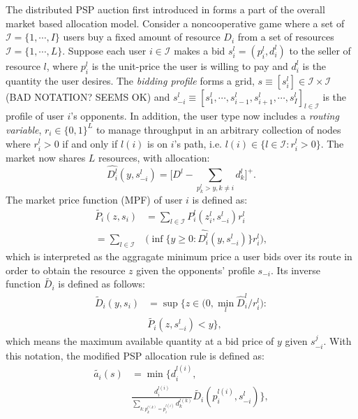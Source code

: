 \documentclass[12pt]{article}
\theoremstyle{definition}
\newcommand{\mcI}{\mathcal{I}}
\begin{document}
\begin{multicols}{2}
The distributed PSP auction first introduced in \cite{lazar} forms a part of the
overall market based allocation model. Consider a noncooperative game
where a set of $\mcI = \lbrace 1,\cdots,I\rbrace$ users buy a fixed
amount of resource $D_i$ from a set of resources $\mcI = \lbrace 1,\cdots,L\rbrace$. Suppose
each user $i \in \mcI$ makes a bid $s_i^l = (p_i^l, d_i^l)$ to the
seller of resource $l$,
where $p_i^l$ is the unit-price the user is willing to pay and $d_i^l$ is the
quantity the user desires. The \emph{bidding profile} forms a grid, $s \equiv
[s_i^l] \in \mcI \times \mcI$ (BAD NOTATION?
SEEMS OK)  and $s_{−i}^l \equiv [s_1^l , \cdots , s_{i−1}^l , s_{i+1}^l , \cdots
, s_I^l]_{l\in\mcI}$ is
the profile of user $i$’s opponents. In addition, the user type now includes a
\emph{routing variable}, $r_i\in\lbrace 0, 1\rbrace^L$ to manage throughput in
an arbitrary collection of nodes where $r_i^l >0$ if and only if $l(i)$ is on
$i$'s path, i.e. $l(i) \in \lbrace l\in \mcI : r_i^l >0\rbrace$. 
The market now shares $L$ resources, with allocation:
$$
    \hat{D_i^l}(y,s_{-i}^l) = \bigg\lbrack D^l -
\displaystyle\sum_{p_k^l > y, k\ne i} d_k^l\bigg\rbrack^+.
$$
The market price function (MPF) of user $i$ is defined as:
\begin{align*}
    \tilde{P_i}(z, s_i) &= \displaystyle\sum_{l\in\mcI}P_i^l(z_i^l,
s_{-i}^l)r_i^l \\
    = \displaystyle\sum_{l\in\mcI}&\bigg(\inf\bigg\lbrace y\ge 0 :
\hat{D_i^l}(y,s_{-i}^l)\bigg\rbrace r_i^l\bigg),
\end{align*}
which is interpreted as the aggragate minimum price a user bids over its route in order to obtain the
resource $z$ given the opponents’ profile $s_{−i}$. Its inverse function
$\tilde{D_i}$ is defined as follows:
\begin{align*}
    \tilde{D}_i(y, s_i) &= \sup\bigg\lbrace z\in \bigg( 0,
\min_l\hat{D}_i^l/r_i^l\bigg) : \\
    &\tilde{P_i}(z,s_{-i}^l) < y\bigg\rbrace,
\end{align*}
which means the maximum available quantity at a bid price of $y$ given
$s_{−i}^j$. With this notation, the modified PSP allocation rule \cite{tuffin} is defined
as:
\begin{align*}
    \tilde{a_i}(s) &= \min\big\lbrace d_i^{l(i)}, \\
 &\frac{d_i^{l(i)}}{\sum_{k:p_k^{l(k)}=p_i^{l(i)}}d_k^{l(k)}} \tilde{D_i}(p_i^{l(i)},
s_{-i}^l)\big\rbrace,
\end{align*}

\end{multicols}
\end{document}
